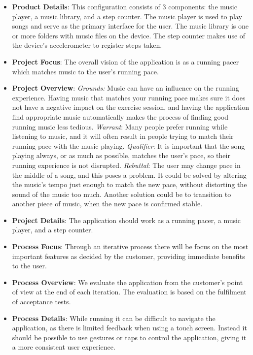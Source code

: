 \begin{itemize}
\item \textbf{Product Details}: This configuration consists of 3 components: the music player, a music library, and a step counter. The music player is used to play songs and serve as the primary interface for the user. The music library is one or more folders with music files on the device. The step counter makes use of the device's accelerometer to register steps taken.

\item \textbf{Project Focus}: The overall vision of the application is as a running pacer which matches music to the user's running pace.

\item \textbf{Project Overview}: \newline
\textit{Grounds:} Music can have an influence on the running experience. Having music that matches your running pace makes sure it does not have a negative impact on the exercise session, and having the application find appropriate music automatically makes the process of finding good running music less tedious. \newline
\textit{Warrant}: Many people prefer running while listening to music, and it will often result in people trying to match their running pace with the music playing. \newline
\textit{Qualifier}: It is important that the song playing always, or as much as possible, matches the user's pace, so their running experience is not disrupted. \newline
\textit{Rebuttal}: The user may change pace in the middle of a song, and this poses a problem. It could be solved by altering the music's tempo just enough to match the new pace, without distorting the sound of the music too much. Another solution could be to transition to another piece of music, when the new pace is confirmed stable.

\item \textbf{Project Details}: The application should work as a running pacer, a music player, and a step counter.

\item \textbf{Process Focus}: Through an iterative process there will be focus on the most important features as decided by the customer, providing immediate benefits to the user.

\item \textbf{Process Overview}: We evaluate the application from the customer's point of view at the end of each iteration. The evaluation is based on the fulfilment of acceptance tests.

\item \textbf{Process Details}: While running it can be difficult to navigate the application, as there is limited feedback when using a touch screen. Instead it should be possible to use gestures or taps to control the application, giving it a more 
consistent user experience.
\end{itemize}